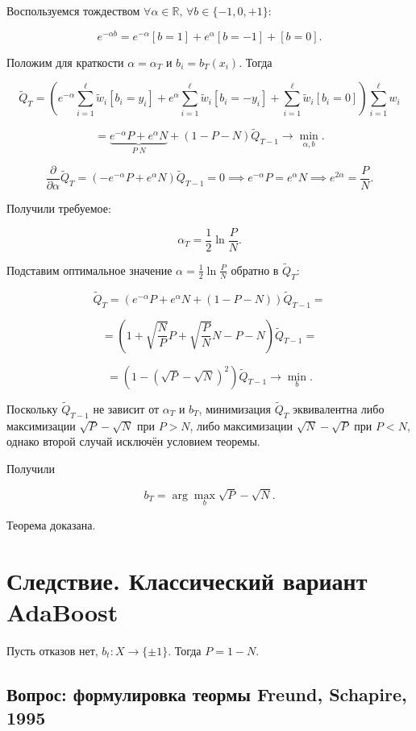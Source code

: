 Воспользуемся тождеством \(\forall \alpha \in \mathbb{R}, \, \forall b \in \{-1, 0, +1\}\):

\[
    e^{-\alpha b} = e^{-\alpha}[b = 1] + e^{\alpha}[b = -1] + [b = 0].
\]

Положим для краткости \(\alpha = \alpha_T\) и \(b_i = b_T(x_i)\). Тогда

\[
    \widetilde{Q}_T = \left(e^{-\alpha} \sum_{i=1}^\ell \widetilde{w}_i[b_i = y_i] + e^{\alpha} \sum_{i=1}^\ell \widetilde{w}_i[b_i = -y_i] + \sum_{i=1}^\ell \widetilde{w}_i[b_i = 0]\right) \sum_{i=1}^\ell w_i
\]

\[
    = \underbrace{e^{-\alpha} P + e^{\alpha} N}_{P \; N} + (1 - P - N) \widetilde{Q}_{T-1} \rightarrow \min_{\alpha, b}.
\]

\[
    \frac{\partial}{\partial \alpha} \widetilde{Q}_T = (-e^{-\alpha} P + e^{\alpha} N) \widetilde{Q}_{T-1} = 0 \implies e^{-\alpha} P = e^{\alpha} N \implies e^{2\alpha} = \frac{P}{N}.
\]

Получили требуемое:

\[
    \alpha_T = \frac{1}{2} \ln \frac{P}{N}.
\]

Подставим оптимальное значение \(\alpha = \frac{1}{2} \ln \frac{P}{N}\) обратно в \(\widetilde{Q}_T\):

\[
    \widetilde{Q}_T = (e^{-\alpha} P + e^{\alpha} N + (1 - P - N)) \widetilde{Q}_{T-1} =
\]

\[
    = \left(1 + \sqrt{\frac{N}{P}} P + \sqrt{\frac{P}{N}} N - P - N\right) \widetilde{Q}_{T-1} =
\]

\[
    = \left(1 - (\sqrt{P} - \sqrt{N})^2\right) \widetilde{Q}_{T-1} \rightarrow \min_b.
\]

Поскольку \(\widetilde{Q}_{T-1}\) не зависит от \(\alpha_T\) и \(b_T\), минимизация \(\widetilde{Q}_T\) эквивалентна либо максимизации \(\sqrt{P} - \sqrt{N}\) при \(P > N\), либо максимизации \(\sqrt{N} - \sqrt{P}\) при \(P < N\), однако второй случай исключён условием теоремы.

Получили

\[
    b_T = \arg \max_b \sqrt{P} - \sqrt{N}.
\]

Теорема доказана.


\section*{Следствие. Классический вариант AdaBoost}

Пусть отказов нет, $b_t : X \to \{ \pm 1 \}$. Тогда $P = 1 - N$.
\subsection*{Вопрос: формулировка теормы Freund, Schapire, 1995}
